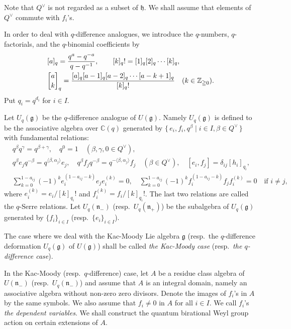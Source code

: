 \documentclass[12pt,twoside]{article}
\newcommand\bra{\langle}
\newcommand\ket{\rangle}
\newcommand\Qv{Q^\vee}
\newcommand\g{{\mathfrak g}}
\newcommand\h{{\mathfrak h}}
\newcommand\n{{\mathfrak n}}
\newcommand\Z{{\mathbb Z}} %
\newcommand\C{{\mathbb C}} %
\theoremstyle{plain} %
\theoremstyle{definition} %
\theoremstyle{definition} %
\numberwithin{theorem}{section}
\numberwithin{equation}{section}
\numberwithin{figure}{section}
\numberwithin{table}{section}
\begin{document}
Note that $\Qv$ is not regarded as a subset of $\h$.
We shall assume that elements of $\Qv$ commute with $f_i$'s.

In order to deal with $q$-difference analogues, 
we introduce the $q$-numbers, $q$-factorials, and 
the $q$-binomial coefficients by
\begin{align*}
 &
 [a]_q = \frac{q^a-q^{-a}}{q-q^{-1}}, \qquad
 [k]_q! = [1]_q[2]_q\cdots[k]_q, \quad
 \\ &
 \qbinom{a}{k}_q =
 \frac{[a]_q[a-1]_q[a-2]_q\cdots[a-k+1]_q}{[k]_q!}
 \quad  (k\in\Z_{\geqq0}).
\end{align*}
Put $q_i = q^{d_i}$ for $i\in I$.

Let $U_q(\g)$ be the $q$-difference analogue of $U(\g)$. 
Namely $U_q(\g)$ is defined to be the associative algebra over $\C(q)$ 
generated by $\{\,e_i,f_i,q^\beta\mid i\in I, \beta\in\Qv \,\}$ 
with fundamental relations:
\begin{align*}
 &
 q^\beta q^\gamma = q^{\beta+\gamma}, \quad q^0=1
 \quad (\beta,\gamma,0\in\Qv),
 \\ &
 q^\beta e_j q^{-\beta} = q^{ \bra\beta,\alpha_j\ket} e_j, \quad
 q^\beta f_j q^{-\beta} = q^{-\bra\beta,\alpha_j\ket} f_j
 \quad (\beta\in\Qv), \quad
 [e_i,f_j] = \delta_{ij}[h_i]_{q_i},
 \\ &
 \sum_{k=0}^{1-a_{ij}} 
 (-1)^k e_i^{(1-a_{ij}-k)}e_je_i^{(k)} = 0,
 \quad
 \sum_{k=0}^{1-a_{ij}} 
 (-1)^k f_i^{(1-a_{ij}-k)}f_jf_i^{(k)} = 0
 \quad\text{if $i\ne j$},
\end{align*}
where $e_i^{(k)}=e_i/[k]_{q_i}!$ and $f_i^{(k)}=f_i/[k]_{q_i}!$.
The last two relations are called the $q$-Serre relations.
Let $U_q(\n_-)$ (resp.\ $U_q(\n_+)$) be 
the subalgebra of $U_q(\g)$ generated by $\{f_i\}_{i\in I}$
(resp.\ $\{e_i\}_{i\in I}$).

The case where we deal with the Kac-Moody Lie algebra $\g$
(resp.\ the $q$-difference deformation $U_q(\g)$ of $U(\g)$)
shall be called {\em the Kac-Moody case} 
(resp.\ {\em the $q$-difference case}).

In the Kac-Moody (resp.\ $q$-difference) case, 
let $A$ be a residue class algebra of $U(\n_-)$ (resp.\ $U_q(\n_-)$)
and assume that $A$ is an integral domain, namely
an associative algebra without non-zero zero divisors.
Denote the images of $f_i$'s in $A$ by the same symbols.
We also assume that $f_i\ne 0$ in $A$ for all $i\in I$.
We call $f_i$'s {\em the dependent variables}.
We shall construct the quantum birational Weyl group action on 
certain extensions of $A$.
\end{document}
